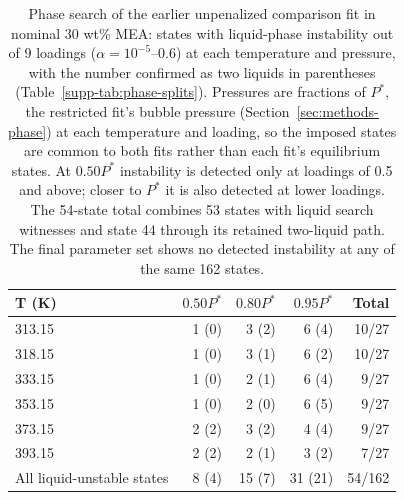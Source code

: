 \begin{table}[pos=!htbp]\small\setlength{\tabcolsep}{3pt}\centering
\caption{Phase search of the earlier unpenalized comparison fit in nominal 30 wt\% MEA: states with liquid-phase instability out of 9 loadings ($\alpha=10^{-5}$--0.6) at each temperature and pressure, with the number confirmed as two liquids in parentheses (Table~\ref{supp-tab:phase-splits}). Pressures are fractions of $P^*$, the restricted fit's bubble pressure (Section~\ref{sec:methods-phase}) at each temperature and loading, so the imposed states are common to both fits rather than each fit's equilibrium states. At $0.50P^*$ instability is detected only at loadings of 0.5 and above; closer to $P^*$ it is also detected at lower loadings. The 54-state total combines 53 states with liquid search witnesses and state 44 through its retained two-liquid path. The final parameter set shows no detected instability at any of the same 162 states.}\label{tab:phase-search-summary}
\begin{tabular}{@{}lrrrr@{}}
\toprule
T (K) & $0.50P^*$ & $0.80P^*$ & $0.95P^*$ & Total \\
\midrule
313.15 & 1 (0) & 3 (2) & 6 (4) & 10/\allowbreak{}27 \\
318.15 & 1 (0) & 3 (1) & 6 (2) & 10/\allowbreak{}27 \\
333.15 & 1 (0) & 2 (1) & 6 (4) & 9/\allowbreak{}27 \\
353.15 & 1 (0) & 2 (0) & 6 (5) & 9/\allowbreak{}27 \\
373.15 & 2 (2) & 3 (2) & 4 (4) & 9/\allowbreak{}27 \\
393.15 & 2 (2) & 2 (1) & 3 (2) & 7/\allowbreak{}27 \\
All liquid-unstable states & 8 (4) & 15 (7) & 31 (21) & 54/\allowbreak{}162 \\
\bottomrule
\end{tabular}
\end{table}
